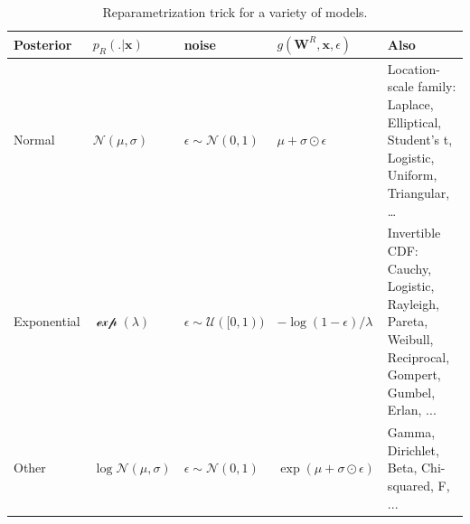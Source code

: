 \documentclass[10pt,letterpaper]{article}
\def\z{\mathbf{z}}
\def\W{\mathbf{W}}
\def\x{\mathbf{x}}
\begin{document}
\begin{table}[H]
  \begin{tabular}{p{1.7cm}|p{1.5cm}|p{1.9cm}|p{2.1cm}|p{5cm}}
         \hline
         Posterior & $p_R(.|\x)$ & noise & $g(\W^R,\x,\epsilon)$ & Also \\ \hline
         Normal & $\mathcal N(\mu,\sigma)$ & $\epsilon \sim \mathcal N(0, 1)$ & $\mu + \sigma \odot \epsilon$ & Location-scale family: Laplace, Elliptical,
         Student’s t, Logistic, Uniform, Triangular, \ldots \\ \hline
         Exponential & $\mathcal \exp(\lambda)$ & $\epsilon \sim \mathcal U([0, 1))$ & $-\log(1-\epsilon)/\lambda$ & Invertible CDF: Cauchy, Logistic, Rayleigh, Pareta, Weibull, Reciprocal, Gompert, Gumbel, Erlan, ... \\ \hline
         Other & $\log\mathcal N(\mu,\sigma)$ & $\epsilon \sim \mathcal N(0, 1)$ & $\exp(\mu + \sigma \odot \epsilon)$ & Gamma, Dirichlet, Beta, Chi-squared, F, ... \\ \hline
  \end{tabular}
  \caption{Reparametrization trick \citep{kingma2013auto} for a variety of models.}
  \label{tab:rptrick}
\end{table}

\end{document}
